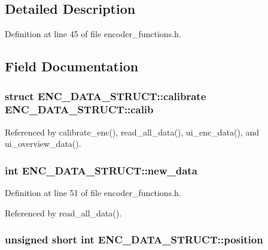 \subsection{Detailed Description}


Definition at line 45 of file encoder\-\_\-functions.\-h.



\subsection{Field Documentation}
\hypertarget{structENC__DATA__STRUCT_af227e5bbb714b830cc570432bda0a468}{
\subsubsection[{calib}]{\setlength{\rightskip}{0pt plus 5cm}struct {\bf E\-N\-C\-\_\-\-D\-A\-T\-A\-\_\-\-S\-T\-R\-U\-C\-T\-::calibrate} E\-N\-C\-\_\-\-D\-A\-T\-A\-\_\-\-S\-T\-R\-U\-C\-T\-::calib}}\label{structENC__DATA__STRUCT_af227e5bbb714b830cc570432bda0a468}


Referenced by calibrate\-\_\-enc(), read\-\_\-all\-\_\-data(), ui\-\_\-enc\-\_\-data(), and ui\-\_\-overview\-\_\-data().

\hypertarget{structENC__DATA__STRUCT_adbfb6e5764f0e3c42f4e212deb5d1f21}{
\subsubsection[{new\-\_\-data}]{\setlength{\rightskip}{0pt plus 5cm}int E\-N\-C\-\_\-\-D\-A\-T\-A\-\_\-\-S\-T\-R\-U\-C\-T\-::new\-\_\-data}}\label{structENC__DATA__STRUCT_adbfb6e5764f0e3c42f4e212deb5d1f21}


Definition at line 51 of file encoder\-\_\-functions.\-h.



Referenced by read\-\_\-all\-\_\-data().

\hypertarget{structENC__DATA__STRUCT_ac3a53ed44ecaf87285518a091e1d2c24}{
\subsubsection[{position}]{\setlength{\rightskip}{0pt plus 5cm}unsigned short int E\-N\-C\-\_\-\-D\-A\-T\-A\-\_\-\-S\-T\-R\-U\-C\-T\-::position}}\label{structENC__DATA__STRUCT_ac3a53ed44ecaf87285518a091e1d2c24}


